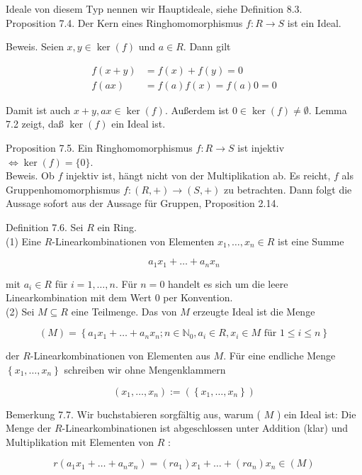 \documentclass[10pt, letterpaper]{article}
\begin{document}
Ideale von diesem Typ nennen wir Hauptideale, siehe Definition 8.3.\\
Proposition 7.4. Der Kern eines Ringhomomorphismus $f: R \rightarrow S$ ist ein Ideal.

Beweis. Seien $x, y \in \operatorname{ker}(f)$ und $a \in R$. Dann gilt

$$
\begin{aligned}
f(x+y) & =f(x)+f(y)=0 \\
f(a x) & =f(a) f(x)=f(a) 0=0
\end{aligned}
$$

Damit ist auch $x+y, a x \in \operatorname{ker}(f)$. Außerdem ist $0 \in \operatorname{ker}(f) \neq \emptyset$. Lemma 7.2 zeigt, daß $\operatorname{ker}(f)$ ein Ideal ist.

Proposition 7.5. Ein Ringhomomorphismus $f: R \rightarrow S$ ist injektiv $\Longleftrightarrow \operatorname{ker}(f)=\{0\}$.\\
Beweis. Ob $f$ injektiv ist, hängt nicht von der Multiplikation ab. Es reicht, $f$ als Gruppenhomomorphismus $f:(R,+) \rightarrow(S,+)$ zu betrachten. Dann folgt die Aussage sofort aus der Aussage für Gruppen, Proposition 2.14.

Definition 7.6. Sei $R$ ein Ring.\\
(1) Eine $R$-Linearkombinationen von Elementen $x_{1}, \ldots, x_{n} \in R$ ist eine Summe

$$
a_{1} x_{1}+\ldots+a_{n} x_{n}
$$

mit $a_{i} \in R$ für $i=1, \ldots, n$. Für $n=0$ handelt es sich um die leere Linearkombination mit dem Wert 0 per Konvention.\\
(2) Sei $M \subseteq R$ eine Teilmenge. Das von $M$ erzeugte Ideal ist die Menge

$$
(M)=\left\{a_{1} x_{1}+\ldots+a_{n} x_{n} ; n \in \mathbb{N}_{0}, a_{i} \in R, x_{i} \in M \text { für } 1 \leq i \leq n\right\}
$$

der $R$-Linearkombinationen von Elementen aus $M$. Für eine endliche Menge $\left\{x_{1}, \ldots, x_{n}\right\}$ schreiben wir ohne Mengenklammern

$$
\left(x_{1}, \ldots, x_{n}\right):=\left(\left\{x_{1}, \ldots, x_{n}\right\}\right)
$$

Bemerkung 7.7. Wir buchstabieren sorgfältig aus, warum ( $M$ ) ein Ideal ist: Die Menge der $R$-Linearkombinationen ist abgeschlossen unter Addition (klar) und Multiplikation mit Elementen von $R$ :

$$
r\left(a_{1} x_{1}+\ldots+a_{n} x_{n}\right)=\left(r a_{1}\right) x_{1}+\ldots+\left(r a_{n}\right) x_{n} \in(M)
$$
\end{document}
